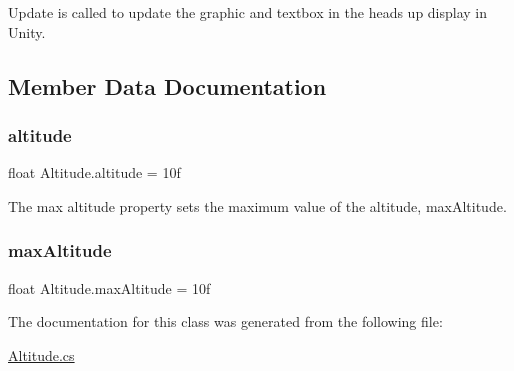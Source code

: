 Update is called to update the graphic and textbox in the heads up display in Unity. 



\subsection{Member Data Documentation}
\mbox{\label{class_altitude_ac0178e16c5daaf6a463572ed64fa48d5}} 
\subsubsection{\texorpdfstring{altitude}{altitude}}
{\footnotesize\ttfamily float Altitude.\+altitude = 10f\hspace{0.3cm}{\ttfamily [static]}}



The max altitude property sets the maximum value of the altitude, max\+Altitude. 

\mbox{\label{class_altitude_a729301c655fbbb37140cb45ed5ad5292}} 
\subsubsection{\texorpdfstring{max\+Altitude}{maxAltitude}}
{\footnotesize\ttfamily float Altitude.\+max\+Altitude = 10f\hspace{0.3cm}{\ttfamily [static]}}



The documentation for this class was generated from the following file\+:\begin{DoxyCompactItemize}
\item 
\hyperlink{_altitude_8cs}{Altitude.\+cs}\end{DoxyCompactItemize}

